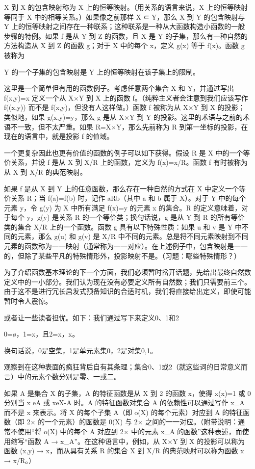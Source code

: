 \documentclass[12pt,a4paper]{ctexbook}
\theoremstyle{definition}
\theoremstyle{remark}
\begin{document}
X 到 X 的包含映射称为 X 上的恒等映射。（用关系的语言来说，X 上的恒等映射等同于 X 中的相等关系。）如果像之前那样 X ⊂ Y，那么 X 到 Y 的包含映射与 Y 上的恒等映射之间存在一种联系；这种联系是一种从大函数构造小函数的一般步骤的特例。如果 f 是从 Y 到 Z 的函数，且 X 是 Y 的子集，那么有一种自然的方法构造从 X 到 Z 的函数 g；对于 X 中的每个 x，定义 g(x) 等于 f(x)。函数 g 被称为

Y 的一个子集的包含映射是 Y 上的恒等映射在该子集上的限制。

这里是一个简单但有用的函数例子。考虑任意两个集合 X 和 Y，并通过写出 f(x,y)=x 定义一个从 X×Y 到 X 上的函数 f。（纯粹主义者会注意到我们应该写作 f((x,y)) 而不是 f(x,y)，但没有人这样做。）函数 f 被称为从 X×Y 到 X 的投影；类似地，如果 g(x,y)=y，那么 g 是从 X×Y 到 Y 的投影。这里的术语与之前的术语不一致，但不太严重。如果 R=X×Y，那么先前称为 R 到第一坐标的投影，在现在的语言中，就是投影 f 的值域。

一个更复杂因此也更有价值的函数的例子可以如下获得。假设 R 是 X 中的一个等价关系，并设 f 是从 X 到 X/R 上的函数，定义为 f(x)=x/R。函数 f 有时被称为从 X 到 X/R 的典范映射。

如果 f 是从 X 到 Y 上的任意函数，那么存在一种自然的方式在 X 中定义一个等价关系 R；当 f(a)=f(b) 时，记作 aRb（其中 a 和 b 属于 X）。对于 Y 中的每个元素 y，令 g(y) 为 X 中所有满足 f(x)=y 的元素 x 的集合。R 的定义意味着，对于每个 y，g(y) 是关系 R 的一个等价类；换句话说，g 是从 Y 到 R 的所有等价类的集合 X/R 上的一个函数。函数 g 具有以下特殊性质：如果 u 和 v 是 Y 中不同的元素，那么 g(u) 和 g(v) 是 X/R 中不同的元素。总是将不同元素映射到不同元素的函数称为一一映射（通常称为一一对应）。在上述例子中，包含映射是一一的，但除了某些平凡的特殊情形外，投影映射不是。（习题：哪些特殊情形？）

为了介绍函数基本理论的下一个方面，我们必须暂时岔开话题，先给出最终自然数定义中的一小部分。我们认为现在没有必要定义所有自然数；我们只需要前三个。由于这不是进行冗长启发式预备知识的合适时机，我们将直接给出定义，即使可能暂时令人震惊。

或者让一些读者担忧。如下：我们通过写下来定义0、1和2

0=ø，1={x}，且2={x，{x}}。

换句话说，0是空集，1是单元素集{0}，2是对集{0,1}。

观察到在这种表面的疯狂背后自有其条理；集合0、1或2（就这些词的日常意义而言）中的元素个数分别是零、一或二。

如果 A 是集合 X 的子集，A 的特征函数是从 X 到 2 的函数 x，使得 x(x)=1 或 0 分别当 x eA 或 xeX-A 时。A 的特征函数对集合 A 的依赖性可以通过写作 x\_A 而不是 x 来表示。将 X 的每个子集 A（即 o(X) 的每个元素）对应到 A 的特征函数（即 2× 的一个元素）的函数是 0(X) 与 2× 之间的一一对应。（附带说明：通常不使用“将 o(X) 中的每个 A 对应到 2× 中的元素 x\_A 的函数”这种表述，而使用缩写“函数 A → x\_A”。在这种语言中，例如，从 X×Y 到 X 的投影可以称为函数 (x,y) → x，而从具有关系 R 的集合 X 到 X/R 的典范映射可以称为函数 x → x/R。）
\end{document}
